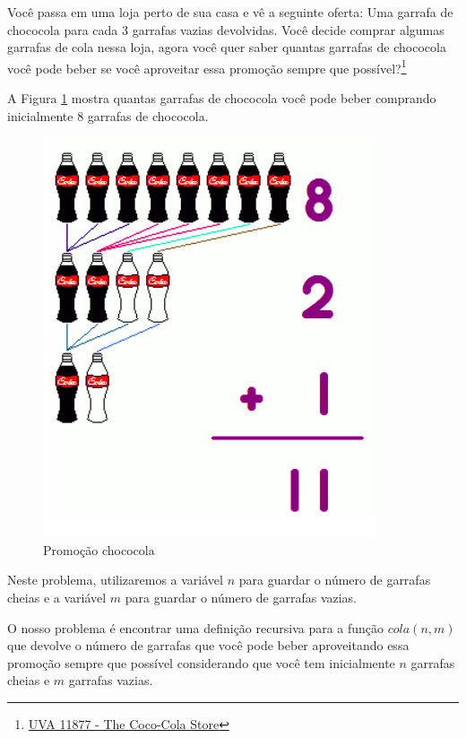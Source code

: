 \begin{exemplo}
Você passa em uma loja perto de sua casa e vê a seguinte oferta: Uma garrafa de chococola para cada 3 garrafas vazias devolvidas. Você decide comprar algumas garrafas de cola nessa loja, agora você quer saber quantas garrafas de chococola você pode beber se você aproveitar essa promoção sempre que possível?\footnote{\href{https://onlinejudge.org/index.php?option=onlinejudge&Itemid=8&category=226&page=show_problem&problem=2999}{UVA 11877 - The Coco-Cola Store}}
\end{exemplo}

A Figura \ref{fig::chococola} mostra quantas garrafas de chococola você pode beber comprando inicialmente 8 garrafas de chococola.


\begin{figure}[!htbp]

\label{fig::chococola}
\begin{center}
\includegraphics[scale=0.5]{images/cola.png} 
\end{center}
\caption{Promoção chococola}
\end{figure}

Neste problema, utilizaremos a variável $n$ para guardar o número de garrafas cheias e a variável $m$ para guardar o número de garrafas vazias. 

O nosso problema é encontrar uma definição recursiva para a função $cola(n,m)$ que devolve o número de garrafas que você pode beber aproveitando essa promoção sempre que possível considerando que você tem inicialmente $n$ garrafas cheias e $m$ garrafas vazias.

